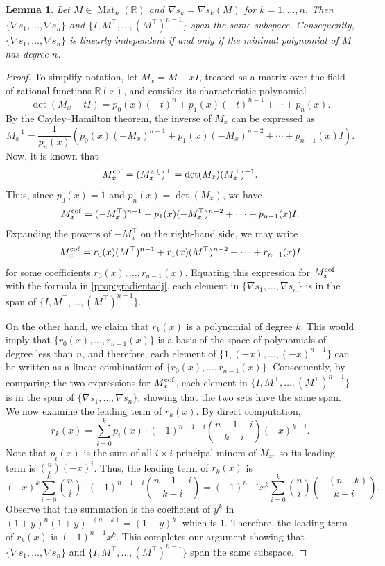 \documentclass{article}
\newtheorem{lemma}[theorem]{Lemma}
\theoremstyle{definition}
\newcommand{\trans}{^\top}
\newcommand{\adj}{^{\rm adj}}
\newcommand{\cof}{^{\rm cof}}
\newcommand{\mat}[1][n]{\operatorname{Mat}_{#1}(\mathbb{R})}
\begin{document}
\begin{lemma}
\label{lem:gradientind}
Let $M\in\mat$ and $\nabla s_k = \nabla s_k(M)$ for $k = 1, \ldots, n$.  Then $
\{\nabla s_1, \ldots, \nabla s_n\}$ and $\{I, M\trans, \ldots, (M\trans)^{n-1}\}$ span the same subspace.  Consequently, $
\{\nabla s_1, \ldots, \nabla s_n\}$ is linearly independent if and only if the minimal polynomial of $M$ has degree $n$.  
\end{lemma}
\begin{proof}
To simplify notation, let $M_x = M - xI$, treated as a matrix over the field of rational functions $\mathbb{R}(x)$, and consider its characteristic polynomial 
\[
    \det(M_x - tI) = p_0(x)(-t)^n + p_1(x)(-t)^{n-1} + \cdots + p_n(x).
\]
By the Cayley--Hamilton theorem, the inverse of $M_x$ can be expressed as 
\[
    M_x^{-1} = \frac{1}{p_n(x)}(p_0(x)(-M_x)^{n-1} + p_1(x)(-M_x)^{n-2} + \cdots + p_{n-1}(x)I).
\]
Now, it is known that 
\[
    M_x\cof = (M_x\adj)\trans = \det(M_x)(M_x\trans)^{-1}.
\]
Thus, since $p_0(x) = 1$ and $p_n(x) = \det(M_x)$, we have 
\[
    M_x\cof = (-M_x\trans)^{n-1} + p_1(x)(-M_x\trans)^{n-2} + \cdots + p_{n-1}(x)I.
\]
Expanding the powers of $-M_x\trans$ on the right-hand side, we may write 
\[
    M_x\cof = r_0(x)(M\trans)^{n-1} + r_1(x)(M\trans)^{n-2} + \cdots + r_{n-1}(x)I
\]
for some coefficients $r_0(x), \dots, r_{n-1}(x)$.
Equating this expression  for $M_x\cof$ with the formula in \cref{prop:gradientadj}, each element in $\{\nabla s_1, \ldots, \nabla s_n\}$ is in the span of $\{I, M\trans, \ldots, (M\trans)^{n-1}\}$.  

On the other hand, we claim that $r_k(x)$ is a polynomial of degree $k$.  This would imply that $\{r_0(x), \ldots, r_{n-1}(x)\}$ is a basis of the space of polynomials of degree less than $n$, and  therefore, each element of $\{1, (-x), \ldots, (-x)^{n-1}\}$ can be written as a linear combination of $\{r_0(x), \ldots, r_{n-1}(x)\}$.  Consequently, by comparing the two expressions for  $M_x\cof $, each element in $\{I, M\trans, \ldots, (M\trans)^{n-1}\}$ is  in the span of $\{\nabla s_1, \ldots, \nabla s_n\}$, showing that the  two sets  have the same span.   We now examine the leading term of $r_k(x)$.    By direct computation, 
\[
    r_k(x) = \sum_{i=0}^{k} p_i(x) \cdot (-1)^{n-1-i} \binom{n-1-i}{k-i}(-x)^{k-i}.
\]
Note that $p_i(x)$ is the sum of all $i\times i$ principal minors of $M_x$, so its leading term is $\binom{n}{i}(-x)^i$.  Thus, the leading term of $r_k(x)$ is 
\[
    (-x)^{k}\sum_{i=0}^{k} \binom{n}{i} \cdot (-1)^{n-1-i} \binom{n-1-i}{k-i} = (-1)^{n-1}x^{k}\sum_{i=0}^{k} \binom{n}{i}\binom{-(n-k)}{k-i}.
\]
Observe that the summation is the coefficient of $y^k$ in $(1+y)^n(1+y)^{-(n-k)} = (1+y)^k$, which is $1$.   Therefore, the leading term of $r_k(x)$ is $(-1)^{n-1}x^k$.  This completes our argument showing that $
\{\nabla s_1, \ldots, \nabla s_n\}$ and $\{I, M\trans, \ldots, (M\trans)^{n-1}\}$ span the same subspace.


\end{proof}
\end{document}
